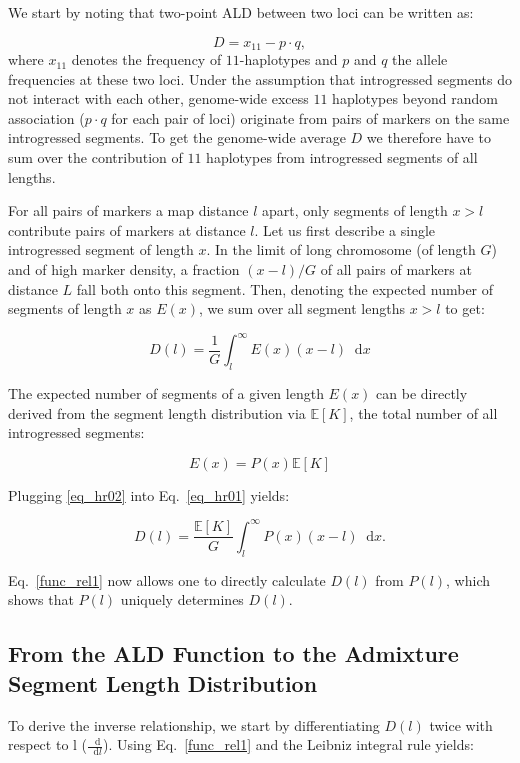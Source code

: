 \documentclass[11pt]{article}
\newcommand*\diff{\mathop{}\!\mathrm{d}}
\begin{document}
We start by noting that two-point ALD between two loci can be written as: 

\begin{equation*}
D = x_{11} - p \cdot q,
\end{equation*}
where $x_{11}$ denotes the frequency of $11$-haplotypes and $p$ and $q$ the allele frequencies at these two loci. Under the assumption that introgressed segments do not interact with each other, genome-wide excess $11$ haplotypes beyond random association ($p\cdot q$ for each pair of loci) originate from pairs of markers on the same introgressed segments. To get the genome-wide average $D$ we therefore have to sum over the contribution of $11$ haplotypes from introgressed segments of all lengths.

For all pairs of markers a map distance $l$ apart, only segments of length $x>l$ contribute pairs of markers at distance $l$. Let us first describe a single introgressed segment of length $x$. In the limit of long chromosome (of length $G$) and of high marker density, a fraction $(x-l)/G$ of all pairs of markers at distance $L$ fall both onto this segment. Then, denoting the expected number of segments of length $x$ as $E(x)$, we sum over all segment lengths $x>l$ to get:

\begin{equation}
D(l) = \frac{1}{G} \int_l^\infty E(x) (x-l) \diff x
\label{eq_hr01}
\end{equation}

The expected number of segments of a given length $E(x)$ can be directly derived from the segment length distribution via $\mathbb{E}[K]$, the total number of all introgressed segments:

\begin{equation}
E(x) = P(x) \mathbb{E}[K]
\label{eq_hr02}
\end{equation} 

Plugging \ref{eq_hr02} into Eq.~\ref{eq_hr01} yields:

\begin{equation}
D(l) = \frac{\mathbb{E}[K]}{G} \int_l^\infty P(x) (x-l) \diff x.
\label{func_rel1}
\end{equation}

Eq.~\ref{func_rel1} now allows one to directly calculate $D(l)$ from $P(l)$, which shows that $P(l)$ uniquely determines $D(l)$. 

\subsection{From the ALD Function to the Admixture Segment Length Distribution}
To derive the inverse relationship, we start by differentiating $D(l)$ twice with respect to l ($\frac{\diff}{\diff l}$). Using Eq.~\ref{func_rel1} and the Leibniz integral rule yields:
\end{document}
